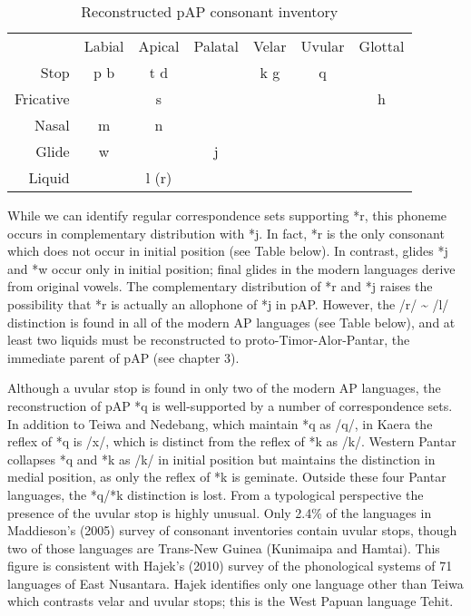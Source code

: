 \begin{table}\centering
\begin{tabular}{rcccccc}
  &  Labial  &  Apical  &  Palatal  &  Velar  &  Uvular  &  Glottal\\
Stop  &  p  b  &  t  d  &   &  k  g  &  q  & \\
Fricative  &   &  s  &   &   &   &  h\\
Nasal  &  m  &  n  &   &   &   & \\
Glide  &  w  &   &  j  &   &   & \\
Liquid  &   &  l (r)  &   &   &   & \\
\end{tabular}

\caption{Reconstructed pAP consonant inventory}
\label{bkm:Ref213888527}
\end{table}

While we can identify regular correspondence sets supporting *r, this phoneme occurs in complementary distribution with *j. In fact, *r is the only consonant which does not occur in initial position (see Table  below). In contrast, glides *j and *w occur only in initial position; final glides in the modern languages derive from original vowels. The complementary distribution of *r and *j raises the possibility that *r is actually an allophone of *j in pAP. However, the /r/ \~{} /l/ distinction is found in all of the modern AP languages (see Table  below), and at least two liquids must be reconstructed to proto-Timor-Alor-Pantar, the immediate parent of pAP (see chapter 3).

Although a uvular stop is found in only two of the modern AP languages, the reconstruction of pAP *q is well-supported by a number of correspondence sets. In addition to Teiwa and Nedebang, which maintain *q as /q/, in Kaera the reflex of *q is /x/, which is distinct from the reflex of *k as /k/. Western Pantar collapses *q and *k as /k/ in initial position but maintains the distinction in medial position, as only the reflex of *k is geminate. Outside these four Pantar languages, the *q/*k distinction is lost. From a typological perspective the presence of the uvular stop is highly unusual. Only 2.4\% of the languages in Maddieson's (2005) survey of consonant inventories contain uvular stops, though two of those languages are Trans-New Guinea (Kunimaipa and Hamtai). This figure is consistent with Hajek's (2010) survey of the phonological systems of 71 languages of East Nusantara. Hajek identifies only one language other than Teiwa which contrasts velar and uvular stops; this is the West Papuan language Tehit.\nocite{Maddieson2005,Hajek2010}


